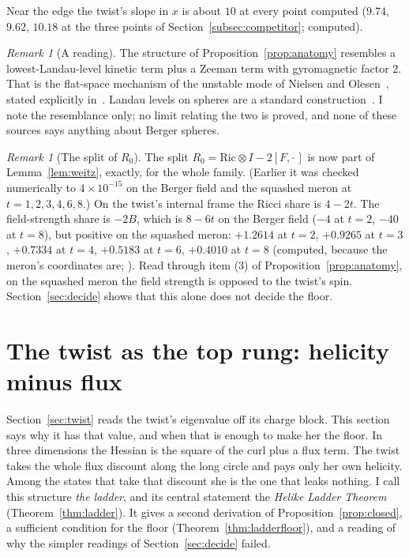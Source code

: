 \documentclass[11pt]{article}
\theoremstyle{definition}
\theoremstyle{remark}
\newtheorem{remark}[theorem]{Remark}
\begin{document}
Near the edge the twist's slope in $x$ is about $10$ at every point computed ($9.74$, $9.62$, $10.18$ at the three
points of Section~\ref{subsec:competitor}; computed).

\begin{remark}[A reading]\label{rem:landau}
The structure of Proposition~\ref{prop:anatomy} resembles a lowest-Landau-level kinetic term plus a Zeeman term with
gyromagnetic factor $2$. That is the flat-space mechanism of the unstable mode of Nielsen and
Olesen~\cite{nielsenolesen1978}, stated explicitly in~\cite{bcgk2014}. Landau levels on spheres are a standard
construction~\cite{haldane1983,wuyang1976}. I note the resemblance only; no limit relating the two is proved, and none
of these sources says anything about Berger spheres.
\end{remark}

\begin{remark}[The split of $R_0$]\label{rem:split}
The split $R_0=\mathrm{Ric}\otimes I-2[F,\cdot\,]$ is now part of Lemma~\ref{lem:weitz}, exactly, for the whole family.
(Earlier it was checked numerically to $4\times10^{-15}$ on the Berger field and the squashed meron at
$t=1,2,3,4,6,8$.) On the twist's internal frame the Ricci share is $4-2t$. The field-strength share is $-2B$, which is
$8-6t$ on the Berger field ($-4$ at $t=2$, $-40$ at $t=8$), but positive on the squashed meron: $+1.2614$ at $t=2$,
$+0.9265$ at $t=3$, $+0.7334$ at $t=4$, $+0.5183$ at $t=6$, $+0.4010$ at $t=8$ (computed, because the meron's coordinates
are; ). Read through item (3) of
Proposition~\ref{prop:anatomy}, on the squashed meron the field strength is opposed to the twist's spin.
Section~\ref{sec:decide} shows that this alone does not decide the floor.
\end{remark}

\section{The twist as the top rung: helicity minus flux}\label{sec:ladder}

Section~\ref{sec:twist} reads the twist's eigenvalue off its charge block. This section says why it has that value,
and when that is enough to make her the floor. In three dimensions the Hessian is the square of the curl plus a flux
term. The twist takes the whole flux discount along the long circle and pays only her own helicity. Among the states
that take that discount she is the one that leaks nothing. I call this structure \emph{the ladder}, and its central statement the \emph{Helike Ladder Theorem}
(Theorem~\ref{thm:ladder}). It gives a second
derivation of Proposition~\ref{prop:closed}, a sufficient condition for the floor (Theorem~\ref{thm:ladderfloor}), and a
reading of why the simpler readings of Section~\ref{sec:decide} failed.
\end{document}

